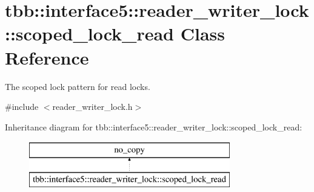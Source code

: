 \hypertarget{classtbb_1_1interface5_1_1reader__writer__lock_1_1scoped__lock__read}{}\section{tbb\+:\+:interface5\+:\+:reader\+\_\+writer\+\_\+lock\+:\+:scoped\+\_\+lock\+\_\+read Class Reference}
\label{classtbb_1_1interface5_1_1reader__writer__lock_1_1scoped__lock__read}


The scoped lock pattern for read locks.  




{\ttfamily \#include $<$reader\+\_\+writer\+\_\+lock.\+h$>$}

Inheritance diagram for tbb\+:\+:interface5\+:\+:reader\+\_\+writer\+\_\+lock\+:\+:scoped\+\_\+lock\+\_\+read\+:\begin{figure}[H]
\begin{center}
\leavevmode
\includegraphics[height=2.000000cm]{classtbb_1_1interface5_1_1reader__writer__lock_1_1scoped__lock__read}
\end{center}
\end{figure}
